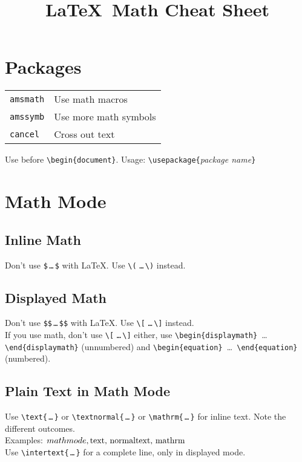 \documentclass[draft]{cheatsht}
\begin{document}
\title{\LaTeX~Math Cheat Sheet}

\section{Packages}

\begin{tabular}{@{}ll@{}}
\texttt{amsmath} & Use math macros \\
\texttt{amssymb} & Use more math symbols \\
\texttt{cancel} & Cross out text
\end{tabular}

Use before \verb!\begin{document}!.
Usage: \verb!\usepackage{!\textit{package name}\verb!}!

\section{Math Mode}
\subsection{Inline Math}
Don't use \verb!$!\,\verb!…!\,\verb!$! with \LaTeX.
Use \verb!\(! \verb!…!\,\verb!\)! instead.

\subsection{Displayed Math}
Don't use \verb!$$!\,\verb!…!\,\verb!$$! with \LaTeX. Use
\verb!\[! \verb!…!\,\verb!\]! instead. \\

If you use \AmS\hspace{1pt}math, don't use \verb!\[! \verb!…!\,\verb!\]! either,
use \verb!\begin{displaymath} !\ldots\verb! \end{displaymath}! (unnumbered) and
\verb!\begin{equation} !\ldots\verb! \end{equation}! (numbered).

\subsection{Plain Text in Math Mode}
Use \verb!\text{!\,\verb!…!\,\verb!}! or \verb!\textnormal{!\,\verb!…!\,\verb!}!
or \verb!\mathrm{!\,\verb!…!\,\verb!}! for inline text.
Note the different outcomes.\\
Examples:
\( math mode, \text{text,~} \textnormal{normaltext,~} \mathrm{mathrm}\)\\
Use \verb!\intertext{!\,\verb!…!\,\verb!}! for a complete line, only in
displayed mode.
\end{document}
